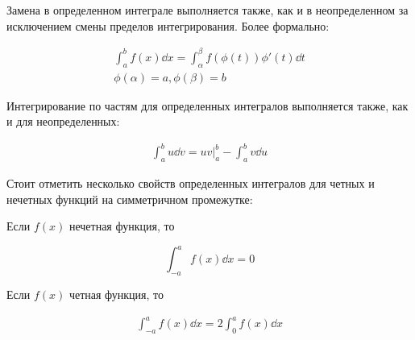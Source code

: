 
Замена в определенном интеграле выполняется также, как и в неопределенном за
исключением смены пределов интегрирования. Более формально:

\begin{align*}
  \int_{a}^{b} f(x) \dd x = \int_{\alpha}^{\beta} f(\phi(t)) \phi'(t) \dd t \\
  \phi(\alpha) = a, \phi(\beta) = b
\end{align*}

Интегрирование по частям для определенных интегралов выполняется также, как и
для неопределенных:

\begin{align*}
  \int_{a}^{b} u \dd v = u v \bigg\vert_{a}^{b} - \int_{a}^{b} v \dd u
\end{align*}

Стоит отметить несколько свойств определенных интегралов для четных и нечетных
функций на симметричном промежутке:

\begin{twocolumns}
  \begin{lemma}
    Если \(f(x)\) нечетная функция, то

    \begin{equation*}
      \int_{-a}^{a} f(x) \dd x = 0
    \end{equation*}
  \end{lemma}
  
  \begin{lemma}
    Если \(f(x)\) четная функция, то
    
    \begin{align*}
      \int_{-a}^{a} f(x) \dd x = 2 \int_{0}^{a} f(x) \dd x
    \end{align*}
  \end{lemma}  
\end{twocolumns}


